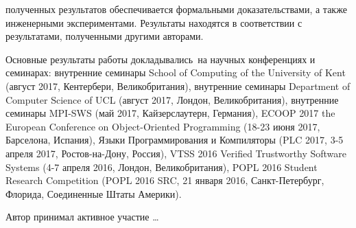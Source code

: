 {\reliability} полученных результатов обеспечивается формальными доказательствами,
а также инженерными экспериментами.
Результаты находятся в соответствии с результатами, полученными другими авторами.

{\probation}
Основные результаты работы докладывались~на научных конференциях и семинарах:
внутренние семинары School of Computing of the University of Kent (август 2017, Кентербери, Великобритания),
внутренние семинары Department of Computer Science of UCL (август 2017, Лондон, Великобритания),
внутренние семинары MPI-SWS (май 2017, Кайзерслаутерн, Германия),
ECOOP 2017 the European Conference on Object-Oriented Programming (18-23 июня 2017, Барселона, Испания),
Языки Программирования и Компиляторы (PLC 2017, 3-5 апреля 2017, Ростов-на-Дону, Россия),
VTSS 2016 Verified Trustworthy Software Systems (4-7 апреля 2016, Лондон, Великобритания),
POPL 2016 Student Research Competition (POPL 2016 SRC, 21 января 2016, Санкт-Петербург, Флорида, Соединенные Штаты Америки).

{\contribution} Автор принимал активное участие \ldots


